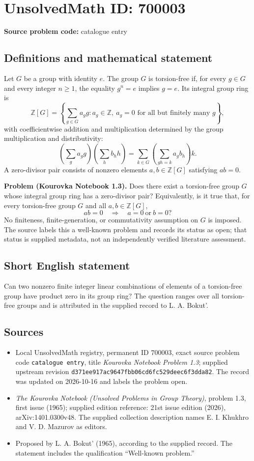 \documentclass[11pt]{article}
\newcommand{\Z}{\mathbb{Z}}
\begin{document}
\section*{UnsolvedMath ID: 700003}
\textbf{Source problem code:} catalogue entry
\subsection{Definitions and mathematical statement}
Let \(G\) be a group with identity \(e\). The group \(G\) is torsion-free if, for every \(g\in G\) and every integer \(n\geq 1\), the equality \(g^n=e\) implies \(g=e\). Its integral group ring is
\[
\Z[G]=\left\{\sum_{g\in G}a_g g : a_g\in\Z,\ a_g=0\text{ for all but finitely many }g\right\},
\]
with coefficientwise addition and multiplication determined by the group multiplication and distributivity:
\[
\left(\sum_g a_g g\right)\left(\sum_h b_h h\right)
=\sum_{k\in G}\left(\sum_{gh=k}a_gb_h\right)k.
\]
A zero-divisor pair consists of nonzero elements \(a,b\in\Z[G]\) satisfying \(ab=0\).

\textbf{Problem (Kourovka Notebook 1.3).} Does there exist a torsion-free group \(G\) whose integral group ring has a zero-divisor pair? Equivalently, is it true that, for every torsion-free group \(G\) and all \(a,b\in\Z[G]\),
\[
ab=0\quad\Longrightarrow\quad a=0\ \text{or}\ b=0?
\]
No finiteness, finite-generation, or commutativity assumption on \(G\) is imposed. The source labels this a well-known problem and records its status as open; that status is supplied metadata, not an independently verified literature assessment.
\subsection{Short English statement}
Can two nonzero finite integer linear combinations of elements of a torsion-free group have product zero in its group ring? The question ranges over all torsion-free groups and is attributed in the supplied record to L. A. Bokut'.
\subsection{Sources}
\begin{itemize}
\item Local UnsolvedMath registry, permanent ID \(700003\), exact source problem code \texttt{catalogue entry}, title \emph{Kourovka Notebook Problem 1.3}; supplied upstream revision \texttt{d371ee917ac9647fbb06cd6fc529deec6f3dda82}. The record was updated on 2026-10-16 and labels the problem open.
\item \emph{The Kourovka Notebook (Unsolved Problems in Group Theory)}, problem 1.3, first issue (1965); supplied edition reference: 21st issue edition (2026), arXiv:1401.0300v48. The supplied collection description names E. I. Khukhro and V. D. Mazurov as editors.
\item Proposed by L. A. Bokut' (1965), according to the supplied record. The statement includes the qualification ``Well-known problem.''
\end{itemize}
\end{document}
